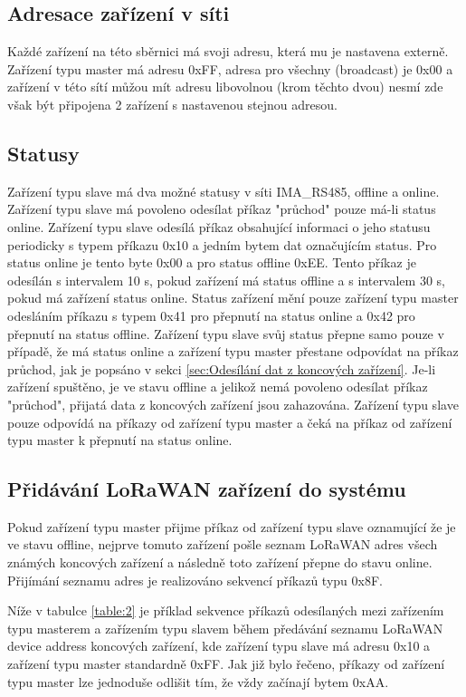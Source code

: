 \subsection{Adresace zařízení v síti}
Každé zařízení na této sběrnici má svoji adresu, která mu je nastavena externě. Zařízení typu master má adresu  0xFF, adresa pro všechny (broadcast) je 0x00 a zařízení v této sítí můžou mít adresu libovolnou (krom těchto dvou) nesmí zde však být připojena 2 zařízení s nastavenou stejnou adresou.

\subsection{Statusy}
Zařízení typu slave má dva možné statusy v síti IMA\_RS485, offline a online. Zařízení typu slave má povoleno odesílat příkaz "průchod" pouze má-li status online.  
Zařízení typu slave odesílá příkaz obsahující informaci o jeho statusu periodicky s typem příkazu 0x10 a jedním bytem dat označujícím status. 
Pro status online je tento byte 0x00 a pro status offline 0xEE. 
Tento příkaz je odesílán s intervalem 10 s, pokud zařízení má status offline a s intervalem 30 s, pokud má zařízení status online.
Status zařízení mění pouze zařízení typu master odesláním příkazu s typem 0x41 pro přepnutí na status online a 0x42 pro přepnutí na status offline.
Zařízení typu slave svůj status přepne samo pouze v případě, že má status online a zařízení typu master přestane odpovídat na příkaz průchod, jak je popsáno v sekci \ref{sec:Odesílání dat z koncových zařízení}.
Je-li zařízení spuštěno, je ve stavu offline a jelikož nemá povoleno odesílat příkaz "průchod", přijatá data z koncových zařízení jsou zahazována. 
Zařízení typu slave pouze odpovídá na příkazy od zařízení typu master a čeká na příkaz od zařízení typu master k přepnutí na status online.


\subsection{Přidávání LoRaWAN zařízení do systému}
Pokud zařízení typu master přijme příkaz od zařízení typu slave oznamující že je ve stavu offline, nejprve tomuto zařízení pošle seznam LoRaWAN adres všech známých koncových zařízení a následně toto zařízení přepne do stavu online.
Přijímání seznamu adres je realizováno sekvencí příkazů typu 0x8F. 

Níže v tabulce \ref{table:2} je příklad sekvence příkazů odesílaných mezi zařízením typu masterem a zařízením typu slavem během předávání seznamu LoRaWAN device address koncových zařízení, kde zařízení typu slave má adresu 0x10 a zařízení typu master standardně 0xFF. Jak již bylo řečeno, příkazy od zařízení typu master lze jednoduše odlišit tím, že vždy začínají bytem 0xAA.


